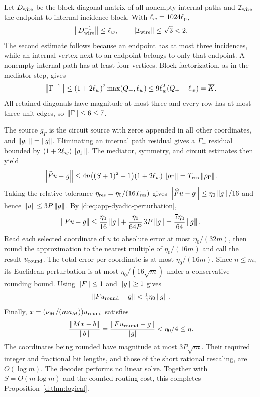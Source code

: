 Let $D_{\rm wire}$ be the block diagonal matrix of all nonempty
internal paths and $\mathcal I_{\rm wire}$ the endpoint-to-internal incidence
block. With $\ell_w=1024\ell_{\rm p}$,
\begin{equation}
 \left\lVert D_{\rm wire}^{-1}\right\rVert\le\ell_w,
 \qquad \left\lVert \mathcal I_{\rm wire}\right\rVert\le\sqrt3<2.
\end{equation}
The second estimate follows because an endpoint has at most three
incidences, while an internal vertex next to an endpoint belongs to
only that endpoint. A nonempty internal path has at least four
vertices. Block factorization, as in the mediator step, gives
\begin{equation}
 \left\lVert \Gamma^{-1}\right\rVert
 \le (1+2\ell_w)^2\max(Q_+,\ell_w)
 \le9\ell_w^2(Q_++\ell_w)=\overline K.
\end{equation}
All retained diagonals have magnitude at most three and every row has
at most three unit edges, so $\left\lVert \Gamma\right\rVert\le6\le7$.

The source $g_\Gamma$ is the circuit source with zeros appended in all
other coordinates, and $\left\lVert g_\Gamma\right\rVert=\left\lVert g\right\rVert$.
Eliminating an internal path residual gives a $\Gamma_+$ residual bounded
by $(1+2\ell_w)\left\lVert \rho_\Gamma\right\rVert$. The mediator, symmetry, and circuit
estimates then yield
\begin{equation}
 \left\lVert \widehat F u-g\right\rVert
 \le4n\bigl((S+1)^2+1\bigr)(1+2\ell_w)\left\lVert \rho_\Gamma\right\rVert
 =T_{\rm res}\left\lVert \rho_\Gamma\right\rVert.
 \label{d:eq:app-full-logical-residual}
\end{equation}
Taking the relative tolerance $\eta_{\rm res}=\eta_0/(16T_{\rm res})$ gives
$\left\lVert \widehat F u-g\right\rVert\le\eta_0\left\lVert g\right\rVert/16$ and hence
$\left\lVert u\right\rVert\le3P\left\lVert g\right\rVert$. By
\eqref{d:eq:app-dyadic-perturbation},
\begin{equation}
 \left\lVert Fu-g\right\rVert
 \le \frac{\eta_0}{16}\left\lVert g\right\rVert
       +\frac{\eta_0}{64P}\,3P\left\lVert g\right\rVert
 =\frac{7\eta_0}{64}\left\lVert g\right\rVert.
\end{equation}
Read each selected coordinate of $u$ to absolute error at most
$\eta_0/(32m)$, then round the approximation to the nearest multiple of
$\eta_0/(16m)$ and call the result $u_{\rm round}$. The total error per
coordinate is at most $\eta_0/(16m)$. Since $n\le m$,
its Euclidean perturbation is at most $\eta_0/(16\sqrt m)$ under a
conservative rounding bound. Using $\left\lVert F\right\rVert\le1$ and
$\left\lVert g\right\rVert\ge1$ gives
\begin{equation}
 \left\lVert Fu_{\rm round}-g\right\rVert<\tfrac14\eta_0\left\lVert g\right\rVert.
\end{equation}
Finally, $x=(\nu_M/(ma_M))u_{\rm round}$ satisfies
\begin{equation}
 \frac{\left\lVert Mx-b\right\rVert}{\left\lVert b\right\rVert}
 =\frac{\left\lVert Fu_{\rm round}-g\right\rVert}{\left\lVert g\right\rVert}
 <\eta_0/4\le\eta.
\end{equation}
The coordinates being rounded have magnitude at most $3P\sqrt m$.
Their required integer and fractional bit lengths, and those of the
short rational rescaling, are $O(\log m)$. The decoder performs no
linear solve. Together with $S=O(m\log m)$ and the counted routing
cost, this completes Proposition~\ref{d:thm:logical}.

